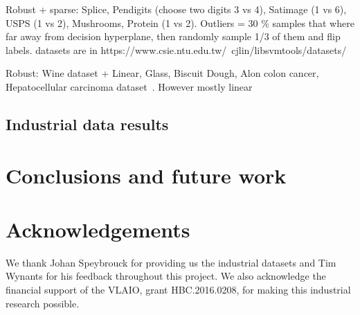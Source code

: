 \documentclass[preprint,12pt]{elsarticle}
\begin{document}
	Robust + sparse: Splice, Pendigits (choose two digits 3 vs 4), Satimage (1 vs 6), USPS (1 vs 2), Mushrooms, Protein (1 vs 2).\cite{chen2018sparse}
	Outliers = 30 \% samples that where far away from decision hyperplane, then randomly sample 1/3 of them and flip labels. datasets are in https://www.csie.ntu.edu.tw/~cjlin/libsvmtools/datasets/ 
	
	Robust: Wine dataset + Linear, Glass, Biscuit Dough, Alon colon cancer, Hepatocellular carcinoma dataset~\cite{debruyne2009robustified}. However mostly linear
	
	\subsection{Industrial data results} 
	
	\section{Conclusions and future work}
	
	\section*{Acknowledgements}
	
	We thank Johan Speybrouck for providing us the industrial datasets and Tim Wynants for his feedback throughout this project. We also acknowledge the financial support of the VLAIO, grant HBC.2016.0208, for making this industrial research possible.
	
	
	
	
	
	
	
	
	
	
	
	
\end{document}
